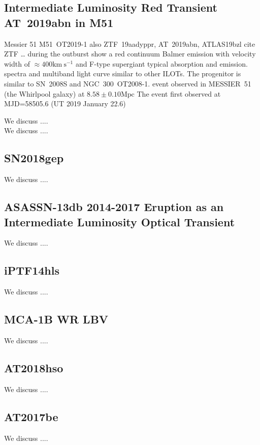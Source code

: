 \documentclass[modern]{aastex63}
\newcommand{\kms}{\mathrm{km~s^{-1}}}
\newcommand{\Mpc}{\mathrm{Mpc}}
\begin{document}
\subsection{Intermediate Luminosity Red Transient AT~2019abn in M51}
Messier 51
M51~OT2019-1 also ZTF~19aadyppr, AT~2019abn, ATLAS19bzl
cite ZTF \cite{2019PASP..131a8002B,2014htu..conf...27B} \dots
during the outburst show a red continuum Balmer emission with velocity width of $\approx 400\kms$ and F-type supergiant typical absorption and emission.
spectra and multiband light curve similar to other ILOTs.
The progenitor is similar to SN~2008S and NGC~300~OT2008-1.
event observed in MESSIER~51 (the Whirlpool galaxy) at $8.58\pm0.10\Mpc$ \citep{2016ApJ...826...21M}
The event first observed at MJD=58505.6 (UT 2019 January 22.6) 

We discuss .... \cite{2019ApJ...880L..20J} \\
We discuss .... \cite{2020arXiv200108782W}

\subsection{SN2018gep}
We discuss .... \cite{2019ApJ...887..169H}

\subsection{ASASSN-13db 2014-2017 Eruption as an Intermediate Luminosity Optical Transient}
We discuss .... \cite{2019Galax...8....2K}

\subsection{iPTF14hls}
We discuss .... \cite{2019A&A...621A..30S} 

\subsection{MCA-1B WR LBV}
We discuss .... \cite{2020MNRAS.492.5897S}


\subsection{AT2018hso}
We discuss .... \cite{2019A&A...632L...6C}

\subsection{AT2017be}
We discuss .... \cite{2018MNRAS.480.3424C}
\end{document}
